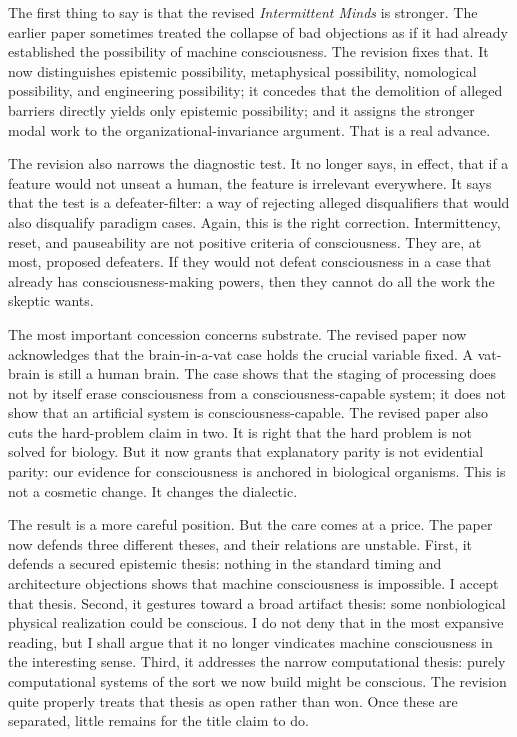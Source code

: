 \documentclass[11pt]{article}
\begin{document}
The first thing to say is that the revised \emph{Intermittent Minds} is stronger. The earlier paper sometimes treated the collapse of bad objections as if it had already established the possibility of machine consciousness. The revision fixes that. It now distinguishes epistemic possibility, metaphysical possibility, nomological possibility, and engineering possibility; it concedes that the demolition of alleged barriers directly yields only epistemic possibility; and it assigns the stronger modal work to the organizational-invariance argument. That is a real advance.

The revision also narrows the diagnostic test. It no longer says, in effect, that if a feature would not unseat a human, the feature is irrelevant everywhere. It says that the test is a defeater-filter: a way of rejecting alleged disqualifiers that would also disqualify paradigm cases. Again, this is the right correction. Intermittency, reset, and pauseability are not positive criteria of consciousness. They are, at most, proposed defeaters. If they would not defeat consciousness in a case that already has consciousness-making powers, then they cannot do all the work the skeptic wants.

The most important concession concerns substrate. The revised paper now acknowledges that the brain-in-a-vat case holds the crucial variable fixed. A vat-brain is still a human brain. The case shows that the staging of processing does not by itself erase consciousness from a consciousness-capable system; it does not show that an artificial system is consciousness-capable. The revised paper also cuts the hard-problem claim in two. It is right that the hard problem is not solved for biology. But it now grants that explanatory parity is not evidential parity: our evidence for consciousness is anchored in biological organisms. This is not a cosmetic change. It changes the dialectic.

The result is a more careful position. But the care comes at a price. The paper now defends three different theses, and their relations are unstable. First, it defends a secured epistemic thesis: nothing in the standard timing and architecture objections shows that machine consciousness is impossible. I accept that thesis. Second, it gestures toward a broad artifact thesis: some nonbiological physical realization could be conscious. I do not deny that in the most expansive reading, but I shall argue that it no longer vindicates machine consciousness in the interesting sense. Third, it addresses the narrow computational thesis: purely computational systems of the sort we now build might be conscious. The revision quite properly treats that thesis as open rather than won. Once these are separated, little remains for the title claim to do.
\end{document}
